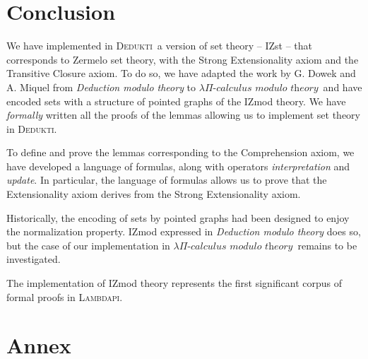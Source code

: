 \documentclass[submission,copyright,creativecommons]{eptcs}
\newcommand{\dedukti}{\textsc{Dedukti}}
\newcommand{\lpcm}{$\lambda \Pi\textit{-calculus modulo theory}$}
\begin{document}
\section{Conclusion}

We have implemented in \dedukti ~a version of set theory -- IZst -- that corresponds to Zermelo set theory, with the Strong Extensionality axiom and the Transitive Closure axiom. To do so, we have adapted the work by G. Dowek and A. Miquel \cite{zermodulo} from \textit{Deduction modulo theory} to \lpcm ~and have encoded sets with a structure of pointed graphs of the IZmod theory. We have \textit{formally} written all the proofs of the lemmas allowing us to implement set theory in \dedukti.

To define and prove the lemmas corresponding to the Comprehension axiom, we have developed a language of formulas, along with operators \textit{interpretation} and \textit{update}. In particular, the language of formulas allows us to prove that the Extensionality axiom derives from the Strong Extensionality axiom.

Historically, the encoding of sets by pointed graphs had been designed to enjoy the normalization property. IZmod expressed in \textit{Deduction modulo theory} does so, but the case of our implementation in \lpcm ~remains to be investigated.

The implementation of IZmod theory represents the first significant corpus of formal proofs in \textsc{Lambdapi}.

\newpage
\section*{Annex}
\end{document}
